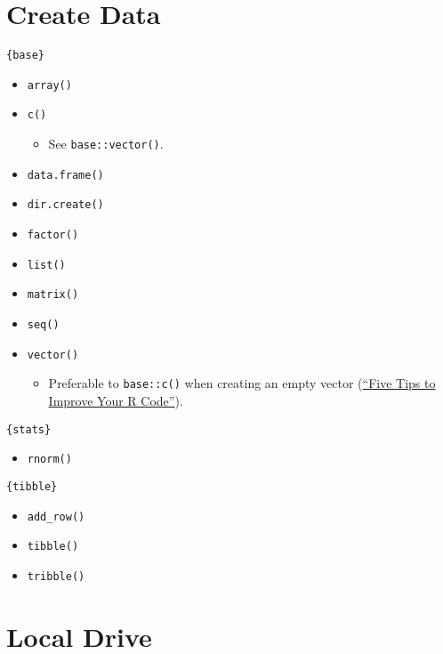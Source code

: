 \documentclass[
]{book}
\providecommand{\tightlist}{%
  \setlength{\itemsep}{0pt}\setlength{\parskip}{0pt}}
\begin{document}
\hypertarget{create-data}{%
\section{Create Data}\label{create-data}}

\texttt{\{base\}}

\begin{itemize}
\tightlist
\item
  \texttt{array()}
\item
  \texttt{c()}

  \begin{itemize}
  \tightlist
  \item
    See \texttt{base::vector()}.
  \end{itemize}
\item
  \texttt{data.frame()}
\item
  \texttt{dir.create()}
\item
  \texttt{factor()}
\item
  \texttt{list()}
\item
  \texttt{matrix()}
\item
  \texttt{seq()}
\item
  \texttt{vector()}

  \begin{itemize}
  \tightlist
  \item
    Preferable to \texttt{base::c()} when creating an empty vector (\href{https://www.datacamp.com/community/tutorials/five-tips-r-code-improve}{``Five Tips to Improve Your R Code''}).
  \end{itemize}
\end{itemize}

\texttt{\{stats\}}

\begin{itemize}
\tightlist
\item
  \texttt{rnorm()}
\end{itemize}

\texttt{\{tibble\}}

\begin{itemize}
\tightlist
\item
  \texttt{add\_row()}
\item
  \texttt{tibble()}
\item
  \texttt{tribble()}
\end{itemize}

\hypertarget{local-drive}{%
\section{Local Drive}\label{local-drive}}
\end{document}
